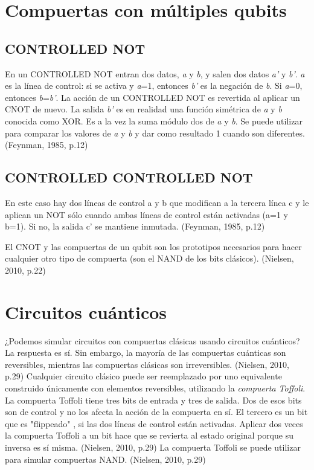 \documentclass[11pt,a4paper]{article}
\begin{document}
\section*{Compuertas con múltiples qubits}
\subsection*{CONTROLLED NOT}

En un CONTROLLED NOT entran dos datos, \textit{a} y \textit{b}, y salen dos datos \textit{a'} y \textit{b'}. \textit{a} es la línea de control: si se activa y \textit{a}=1, entonces \textit{b'} es la negación de \textit{b}. Si \textit{a}=0, entonces \textit{b}=\textit{b'}. La acción de un CONTROLLED NOT es revertida al aplicar un CNOT de nuevo. 
La salida \textit{b'} es en realidad una función simétrica de \textit{a} y \textit{b} conocida como XOR. Es a la vez la suma módulo dos de \textit{a} y \textit{b}. Se puede utilizar para comparar los valores de \textit{a} y \textit{b} y dar como resultado 1 cuando son diferentes. (Feynman, 1985, p.12)

\subsection*{CONTROLLED CONTROLLED NOT}

En este caso hay dos líneas de control a y b que modifican a la tercera línea c y le aplican un NOT sólo cuando ambas líneas de control están activadas (a=1 y b=1). Si no, la salida c' se mantiene inmutada. (Feynman, 1985, p.12)

El CNOT y las compuertas de un qubit son los prototipos necesarios para hacer cualquier otro tipo de compuerta (son el NAND de los bits clásicos). (Nielsen, 2010, p.22)

\section*{Circuitos cuánticos}

¿Podemos simular circuitos con compuertas clásicas usando circuitos cuánticos? La respuesta es sí. Sin embargo, la mayoría de las compuertas cuánticas son reversibles, mientras las compuertas clásicas son irreversibles. (Nielsen, 2010, p.29)
Cualquier circuito clásico puede ser reemplazado por uno equivalente construido únicamente con elementos reversibles, utilizando la \textit{compuerta Toffoli}. La compuerta Toffoli tiene tres bits de entrada y tres de salida. Dos de esos bits son de control y no los afecta la acción de la compuerta en sí. El tercero es un bit que es "flippeado" , si las dos líneas de control están activadas. Aplicar dos veces la compuerta Toffoli a un bit hace que se revierta al estado original porque su inversa es sí misma. (Nielsen, 2010, p.29)
La compuerta Toffoli se puede utilizar para simular compuertas NAND. (Nielsen, 2010, p.29)
\end{document}
